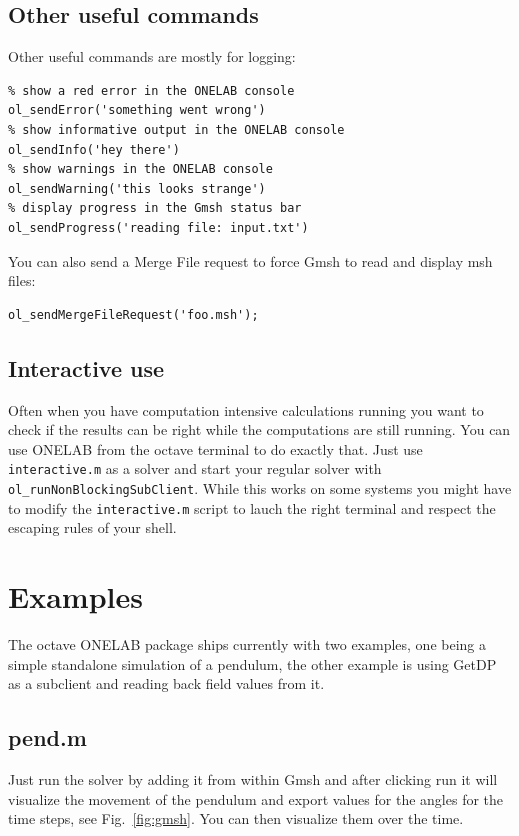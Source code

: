 \documentclass[article,english,colorback,accentcolor=tud9b,11pt]{tudreport}
\begin{document}
		\subsection{Other useful commands}
		Other useful commands are mostly for logging:
		\begin{lstlisting}
% show a red error in the ONELAB console 
ol_sendError('something went wrong')
% show informative output in the ONELAB console
ol_sendInfo('hey there')
% show warnings in the ONELAB console
ol_sendWarning('this looks strange')
% display progress in the Gmsh status bar
ol_sendProgress('reading file: input.txt')
		\end{lstlisting}

		You can also send a Merge File request to force Gmsh to read and display msh files:
		\begin{lstlisting}
ol_sendMergeFileRequest('foo.msh');
		\end{lstlisting}

		\subsection{Interactive use}
		Often when you have computation intensive calculations running you want to check if the results can be right while the computations are still running. You can use ONELAB from the octave terminal to do exactly that. Just use \texttt{interactive.m} as a solver and start your regular solver with \texttt{ol\_runNonBlockingSubClient}. While this works on some systems you might have to modify the \texttt{interactive.m} script to lauch the right terminal and respect the escaping rules of your shell.
		\section{Examples}
		The octave ONELAB package ships currently with two examples, one being a simple standalone simulation of a pendulum, the other example is using GetDP as a subclient and reading back field values from it.
		\subsection{pend.m}
		Just run the solver by adding it from within Gmsh and after clicking run it will visualize the movement of the pendulum and export values for the angles for the time steps, see Fig.~\ref{fig:gmsh}. You can then visualize them over the time.
\end{document}
